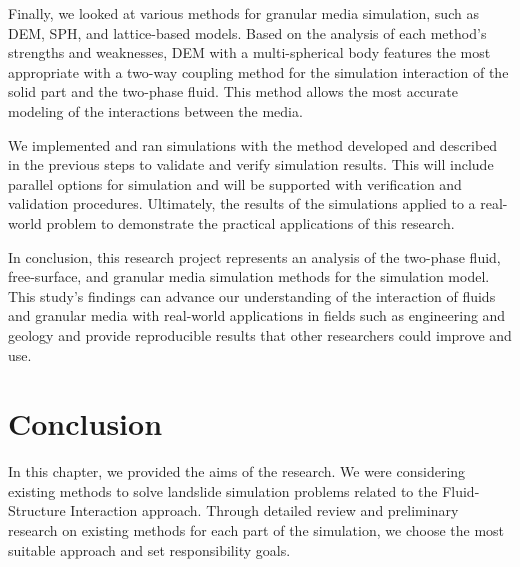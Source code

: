 Finally, we looked at various methods for granular media simulation, such as DEM, SPH, and lattice-based models. Based on the analysis of each method's strengths and weaknesses, DEM with a multi-spherical body features the most appropriate with a two-way coupling method for the simulation interaction of the solid part and the two-phase fluid. This method allows the most accurate modeling of the interactions between the media.

We implemented and ran simulations with the method developed and described in the previous steps to validate and verify simulation results. This will include parallel options for simulation and will be supported with verification and validation procedures.
Ultimately, the results of the simulations applied to a real-world problem to demonstrate the practical applications of this research.

In conclusion, this research project represents an analysis of the two-phase fluid, free-surface, and granular media simulation methods for the simulation model. This study's findings can advance our understanding of the interaction of fluids and granular media with real-world applications in fields such as engineering and geology and provide reproducible results that other researchers could improve and use.

\section{Conclusion}

In this chapter, we provided the aims of the research. We were considering existing methods to solve landslide simulation problems related to the Fluid-Structure Interaction approach. Through detailed review and preliminary research on existing methods for each part of the simulation, we choose the most suitable approach and set responsibility goals. 